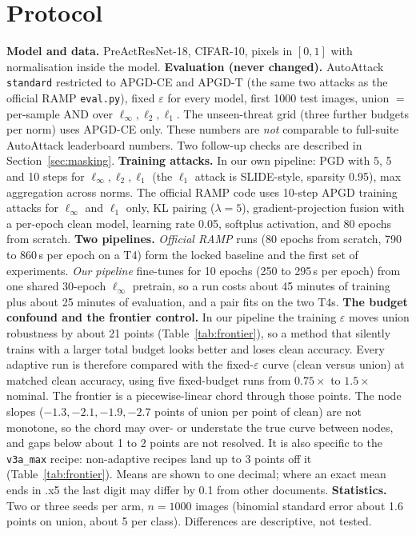 \documentclass[11pt]{article}
\begin{document}
\section{Protocol}
\textbf{Model and data.} PreActResNet-18, CIFAR-10, pixels in $[0,1]$ with normalisation inside the model.
\textbf{Evaluation (never changed).} AutoAttack \texttt{standard} restricted to APGD-CE and APGD-T (the same two attacks as the official RAMP \texttt{eval.py}), fixed $\varepsilon$ for every
model, first 1000 test images, union $=$ per-sample AND over $\ell_\infty,\ell_2,\ell_1$. The unseen-threat grid (three further budgets per norm) uses APGD-CE only.
These numbers are \emph{not} comparable to full-suite AutoAttack leaderboard numbers. Two follow-up checks are described in Section~\ref{sec:masking}.
\textbf{Training attacks.} In our own pipeline: PGD with 5, 5 and 10 steps for $\ell_\infty,\ell_2,\ell_1$ (the $\ell_1$ attack is SLIDE-style, sparsity 0.95), max aggregation across norms.
The official RAMP code uses 10-step APGD training attacks for $\ell_\infty$ and $\ell_1$ only, KL pairing ($\lambda=5$), gradient-projection fusion with a per-epoch clean model, learning rate 0.05, softplus activation, and 80 epochs from scratch.
\textbf{Two pipelines.} \emph{Official RAMP} runs (80 epochs from scratch, 790 to 860\,s per epoch on a T4) form the locked baseline and the first set of experiments.
\emph{Our pipeline} fine-tunes for 10 epochs (250 to 295\,s per epoch) from one shared 30-epoch $\ell_\infty$ pretrain, so a run costs about 45 minutes of training plus about 25 minutes of evaluation, and a pair fits on the two T4s.
\textbf{The budget confound and the frontier control.} In our pipeline the training $\varepsilon$ moves union robustness by about 21 points
(Table~\ref{tab:frontier}), so a method that silently trains with a larger total budget looks better and loses clean accuracy.
Every adaptive run is therefore compared with the fixed-$\varepsilon$ curve (clean versus union) at matched clean accuracy, using five fixed-budget runs from $0.75\times$ to $1.5\times$ nominal.
The frontier is a piecewise-linear chord through those points. The node slopes ($-1.3,-2.1,-1.9,-2.7$ points of union per point of clean) are not monotone, so the chord may over- or understate the true curve between nodes, and gaps below about 1 to 2 points are not resolved. It is also specific to the \texttt{v3a\_max} recipe: non-adaptive recipes land up to 3 points off it (Table~\ref{tab:frontier}). Means are shown to one decimal; where an exact mean ends in .x5 the last digit may differ by 0.1 from other documents.
\textbf{Statistics.} Two or three seeds per arm, $n=1000$ images (binomial standard error about 1.6 points on union, about 5 per class). Differences are descriptive, not tested.
\end{document}
